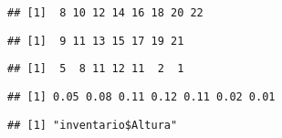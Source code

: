\documentclass[
]{article}
\newenvironment{Shaded}{\begin{snugshade}}{\end{snugshade}}
\newcommand{\NormalTok}[1]{#1}
\newcommand{\SpecialCharTok}[1]{\textcolor[rgb]{0.00,0.00,0.00}{#1}}
\begin{document}
\begin{Shaded}
\end{Shaded}

\begin{verbatim}
## [1]  8 10 12 14 16 18 20 22
\end{verbatim}

\begin{Shaded}
\end{Shaded}

\begin{verbatim}
## [1]  9 11 13 15 17 19 21
\end{verbatim}

\begin{Shaded}
\end{Shaded}

\begin{verbatim}
## [1]  5  8 11 12 11  2  1
\end{verbatim}

\begin{Shaded}
\end{Shaded}

\begin{verbatim}
## [1] 0.05 0.08 0.11 0.12 0.11 0.02 0.01
\end{verbatim}

\begin{Shaded}
\end{Shaded}

\begin{verbatim}
## [1] "inventario$Altura"
\end{verbatim}

\begin{Shaded}
\end{Shaded}
\end{document}
